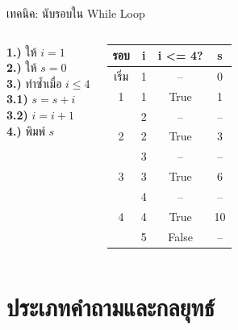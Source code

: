 \documentclass[11pt, aspectratio=169]{beamer}
\begin{document}
\begin{frame}{เทคนิค: นับรอบใน While Loop}
  \begin{columns}[T]
      \begin{pseudobox}
        \textbf{1.)} ให้ $i = 1$ \\
        \textbf{2.)} ให้ $s = 0$ \\
        \textbf{3.)} ทำซํ้าเมื่อ $i \leq 4$ \\
        \qquad \textbf{3.1)} $s = s + i$ \\
        \qquad \textbf{3.2)} $i = i + 1$ \\
        \textbf{4.)} พิมพ์ $s$
      \end{pseudobox}
      \begin{solbox}
        \begin{tabular}{c|c|c|c}
          \textbf{รอบ} & \textbf{i} & \textbf{i <= 4?} & \textbf{s} \\
          \hline
          เริ่ม & 1 & -- & 0 \\
          1 & 1 & True & 1 \\
          & 2 & -- & -- \\
          2 & 2 & True & 3 \\
          & 3 & -- & -- \\
          3 & 3 & True & 6 \\
          & 4 & -- & -- \\
          4 & 4 & True & 10 \\
          & 5 & False & -- \\
        \end{tabular}

      \end{solbox}
  \end{columns}
\end{frame}

\section{ประเภทคำถามและกลยุทธ์}
\end{document}
